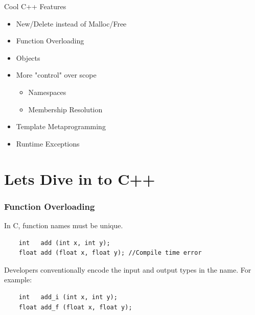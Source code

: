 \documentclass{beamer}
\begin{document}
\begin{frame}{Cool C++ Features}
    \begin{itemize}
        \item New/Delete instead of Malloc/Free
        \item Function Overloading
        \item Objects
        \item More "control" over scope
            \begin{itemize}
                \item Namespaces
                \item Membership Resolution
            \end{itemize}
        \item Template Metaprogramming
        \item Runtime Exceptions
    \end{itemize}
\end{frame}

\section{Lets Dive in to C++}

\begin{frame}[fragile]
    \frametitle{Function Overloading}
    In C, function names must be unique.
    \begin{verbatim}
    int   add (int x, int y);
    float add (float x, float y); //Compile time error
    \end{verbatim}
    Developers conventionally encode the input and output types in the name. For example:
    \begin{verbatim}
    int   add_i (int x, int y);
    float add_f (float x, float y);
    \end{verbatim}
    
\end{frame}
\end{document}
